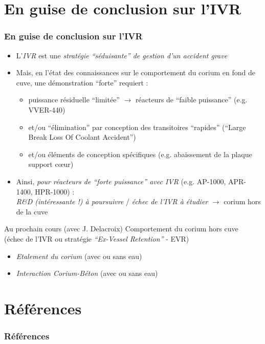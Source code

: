 \documentclass[usenames,dvipsnames,aspectratio=169, 10pt]{beamer}
\renewcommand{\emph}[1]{\textcolor{ceared}{\textit{#1}}}
\begin{document}


\section*{En guise de conclusion sur l'IVR}
\begin{frame}[fragile]
\frametitle{En guise de conclusion sur l'IVR}
\begin{itemize}
\item L'\emph{IVR} est une \emph{stratégie ``séduisante'' de gestion d'un accident grave}
\item Mais, en l'état des connaissances sur le comportement du corium en fond de cuve, une démonstration ``forte'' requiert :
\begin{itemize}
\item puissance résiduelle ``limitée'' $\rightarrow$ réacteurs de ``faible puissance'' (e.g. VVER-440) 
\item et/ou ``élimination'' par conception des transitoires ``rapides'' (``Large Break Loss Of Coolant Accident'')
\item et/ou éléments de conception spécifiques (e.g. abaissement de la plaque support c\oe ur)
\end{itemize}
\item Ainsi, \emph{pour réacteurs de ``forte puissance'' avec IVR} (e.g. AP-1000, APR-1400, HPR-1000) : \\ \emph{R\&D (intéressante !) à poursuivre} / 
\emph{échec de l'IVR à étudier} $\rightarrow$ corium hors de la cuve
\end{itemize}
\begin{exampleblock}{Au prochain cours (avec J. Delacroix)}
Comportement du corium hors cuve \\ (échec de l'IVR ou stratégie \emph{``Ex-Vessel Retention''} - EVR)
\begin{itemize}
  \item \emph{Etalement du corium} (avec ou sans eau)
  \item \emph{Interaction Corium-Béton} (avec ou sans eau)
\end{itemize}
\end{exampleblock}
\end{frame}

\closingframe

\section*{Références}
\begin{frame}
\frametitle{Références}
  
\end{frame}
\end{document}
